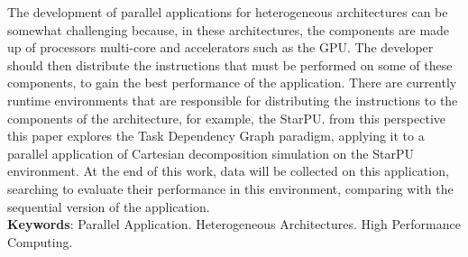 
\begin{resumo}[ABSTRACT]
\begin{SingleSpacing}


The development of parallel applications for heterogeneous architectures can be somewhat challenging because,
in these architectures, the components are made up of processors multi-core and accelerators such as the GPU.
The developer should then distribute the instructions that must be performed on some of these components,
to gain the best performance of the application. There are currently runtime environments that are responsible
for distributing the instructions to the components of the architecture, for example, the StarPU.
from this perspective this paper explores the Task Dependency Graph paradigm, applying it to a parallel application
of Cartesian decomposition simulation on the StarPU environment.
At the end of this work, data will be collected on this application,
searching to evaluate their performance in this environment, comparing with the sequential version of the application.\\

\textbf{Keywords}: Parallel Application. Heterogeneous Architectures. High Performance Computing.

\end{SingleSpacing}
\end{resumo}

